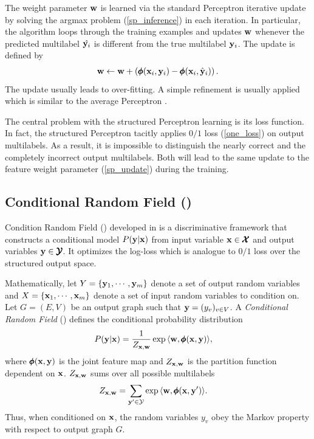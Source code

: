{The weight parameter $\mathbf {w}$ is learned via the standard Perceptron iterative update by solving the argmax problem (\ref{sp_inference}) in each iteration.
In particular, the algorithm loops through the training examples and updates $\mathbf {w}$ whenever the predicted multilabel $\hat{\mathbf {y}_i}$ is different from the true multilabel $\mathbf {y}_i$.
The update is defined by
\begin{align}
	\mathbf {w} \leftarrow \mathbf {w} + \left(\pmb \phi(\mathbf {x}_i,\mathbf {y}_i) - \pmb \phi(\mathbf {x}_i,\hat{\mathbf {y}}_i)\right). \label{sp_update}
\end{align}
The update usually leads to over-fitting.
A simple refinement is usually applied which is similar to the average Perceptron \citep{Freund99large}.

The central problem with the structured Perceptron learning is its loss function.
In fact, the structured Perceptron tacitly applies $0/1$ loss (\ref{one_loss}) on output multilabels.
As a result, it is impossible to distinguish the nearly correct and the completely incorrect output multilabels.
Both will lead to the same update to the feature weight parameter (\ref{sp_update}) during the training.


%
% 
\subsection{Conditional Random Field (\crf)} \label{sc_crf}

Condition Random Field (\crf) developed in \citep{lafferty01,taskar02} is a discriminative framework that constructs a conditional model $P(\mathbf {y}|\mathbf {x})$ from input variable $\mathbf {x}\in\pmb {\mathcal{X}}$ and output variables $\mathbf {y}\in\pmb {\mathcal{Y}}$.
It optimizes the log-loss which is analogue to $0/1$ loss over the structured output space.

Mathematically, let $Y=\{\mathbf {y}_1,\cdots,\mathbf {y}_m\}$ denote a set of output random variables and $X=\{\mathbf {x}_1,\cdots,\mathbf {x}_m\}$ denote a set of input random variables to condition on.
Let $G=(E,V)$ be an output graph such that $\mathbf {y} = (y_v)_{v\in V}$.
A \textit{Conditional Random Field} (\crf) defines the conditional probability distribution
\begin{align*}
	P(\mathbf {y}|\mathbf {x}) &= \frac{1}{Z_{\mathbf {x},\mathbf {w}}}\exp{\langle \mathbf {w}, \pmb \phi(\mathbf {x},\mathbf {y}) \rangle},
\end{align*}
where $\pmb \phi(\mathbf {x},\mathbf {y})$ is the joint feature map and $Z_{\mathbf {x},\mathbf {w}}$ is the partition function dependent on $\mathbf {x}$.
$Z_{\mathbf {x},\mathbf {w}}$ sums over all possible multilabels 
\begin{align}
	Z_{\mathbf {x},\mathbf {w}} &= \sum_{\mathbf {y}'\in\mathcal{Y}}\exp{\langle \mathbf {w}, \pmb \phi(\mathbf {x},\mathbf {y}') \rangle}. \label{crf_partition_function}
\end{align}
Thus, when conditioned on $\mathbf {x}$, the random variables $y_v$ obey the Markov property with respect to output graph $G$.

}
